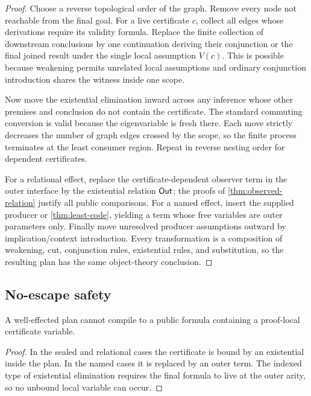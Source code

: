 \begin{proof}
Choose a reverse topological order of the graph.  Remove every node not
reachable from the final goal.  For a live certificate \(c\), collect all edges
whose derivations require its validity formula.  Replace the finite collection
of downstream conclusions by one continuation deriving their conjunction or
the final joined result under the single local assumption \(V(c)\).  This is
possible because weakening permits unrelated local assumptions and ordinary
conjunction introduction shares the witness inside one scope.

Now move the existential elimination inward across any inference whose other
premises and conclusion do not contain the certificate.  The standard
commuting conversion is valid because the eigenvariable is fresh there.  Each
move strictly decreases the number of graph edges crossed by the scope, so the
finite process terminates at the least consumer region.  Repeat in reverse
nesting order for dependent certificates.

For a relational effect, replace the certificate-dependent observer term in
the outer interface by the existential relation \(\mathsf{Out}\); the proofs of
\cref{thm:observed-relation} justify all public comparisons.  For a named
effect, insert the supplied producer or \cref{thm:least-code}, yielding a term
whose free variables are outer parameters only.  Finally move unresolved
producer assumptions outward by implication/context introduction.  Every
transformation is a composition of weakening, cut, conjunction rules,
existential rules, and substitution, so the resulting plan has the same
object-theory conclusion.
\end{proof}

\subsection{No-escape safety}

\begin{corollary}
A well-effected plan cannot compile to a public formula containing a proof-local
certificate variable.
\end{corollary}

\begin{proof}
In the sealed and relational cases the certificate is bound by an existential
inside the plan.  In the named cases it is replaced by an outer term.  The
indexed type of existential elimination requires the final formula to live at
the outer arity, so no unbound local variable can occur.
\end{proof}

